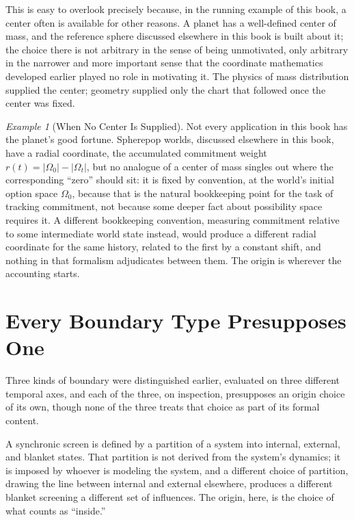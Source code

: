 \documentclass[11pt,fleqn]{book}
\numberwithin{equation}{chapter}
\theoremstyle{plain}
\theoremstyle{definition}
\theoremstyle{remark}
\newtheorem{example}[theorem]{Example}
\providecommand{\enquote}[1]{``#1''}
\begin{document}
This is easy to overlook precisely because, in the running example of this book, a center often is available for other reasons. A planet has a well-defined center of mass, and the reference sphere discussed elsewhere in this book is built about it; the choice there is not arbitrary in the sense of being unmotivated, only arbitrary in the narrower and more important sense that the coordinate mathematics developed earlier played no role in motivating it. The physics of mass distribution supplied the center; geometry supplied only the chart that followed once the center was fixed.

\begin{example}[When No Center Is Supplied]
Not every application in this book has the planet's good fortune. Spherepop worlds, discussed elsewhere in this book, have a radial coordinate, the accumulated commitment weight \(r(t)=|\Omega_0|-|\Omega_t|\), but no analogue of a center of mass singles out where the corresponding \enquote{zero} should sit: it is fixed by convention, at the world's initial option space \(\Omega_0\), because that is the natural bookkeeping point for the task of tracking commitment, not because some deeper fact about possibility space requires it. A different bookkeeping convention, measuring commitment relative to some intermediate world state instead, would produce a different radial coordinate for the same history, related to the first by a constant shift, and nothing in that formalism adjudicates between them. The origin is wherever the accounting starts.
\end{example}

\section{Every Boundary Type Presupposes One}

Three kinds of boundary were distinguished earlier, evaluated on three different temporal axes, and each of the three, on inspection, presupposes an origin choice of its own, though none of the three treats that choice as part of its formal content.

A synchronic screen is defined by a partition of a system into internal, external, and blanket states. That partition is not derived from the system's dynamics; it is imposed by whoever is modeling the system, and a different choice of partition, drawing the line between internal and external elsewhere, produces a different blanket screening a different set of influences. The origin, here, is the choice of what counts as \enquote{inside.}
\end{document}
